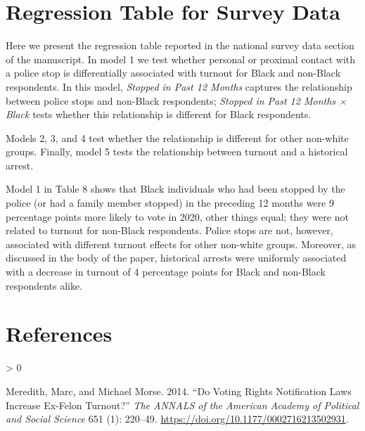 \documentclass[
  12pt,
]{article}
\newlength{\cslhangindent}
\newenvironment{CSLReferences}[2] %
 {%
  \setlength{\parindent}{0pt}
  \ifodd #1 \everypar{\setlength{\hangindent}{\cslhangindent}}\ignorespaces\fi
  \ifnum #2 > 0
  \setlength{\parskip}{#2\baselineskip}
  \fi
 }%
 {}
\begin{document}
\begin{singlespace}

\end{singlespace}

\hypertarget{regression-table-for-survey-data}{%
\section*{Regression Table for Survey Data}\label{regression-table-for-survey-data}}

Here we present the regression table reported in the national survey data section of the manuscript. In model 1 we test whether personal or proximal contact with a police stop is differentially associated with turnout for Black and non-Black respondents. In this model, \emph{Stopped in Past 12 Months} captures the relationship between police stops and non-Black respondents; \emph{Stopped in Past 12 Months × Black} tests whether this relationship is different for Black respondents.

Models 2, 3, and 4 test whether the relationship is different for other non-white groups. Finally, model 5 tests the relationship between turnout and a historical arrest.

\begin{singlespace}

\end{singlespace}

Model 1 in Table 8 shows that Black individuals who had been stopped by the police (or had a family member stopped) in the preceding 12 months were 9 percentage points more likely to vote in 2020, other things equal; they were not related to turnout for non-Black respondents. Police stops are not, however, associated with different turnout effects for other non-white groups. Moreover, as discussed in the body of the paper, historical arrests were uniformly associated with a decrease in turnout of 4 percentage points for Black and non-Black respondents alike.

\newpage

\hypertarget{references}{%
\section*{References}\label{references}}

\hypertarget{refs}{}
\begin{CSLReferences}{1}{0}
\leavevmode\hypertarget{ref-Meredith2014}{}%
Meredith, Marc, and Michael Morse. 2014. {``Do {Voting Rights Notification Laws Increase Ex}-{Felon Turnout}?''} \emph{The ANNALS of the American Academy of Political and Social Science} 651 (1): 220--49. \url{https://doi.org/10.1177/0002716213502931}.

\end{CSLReferences}
\end{document}
